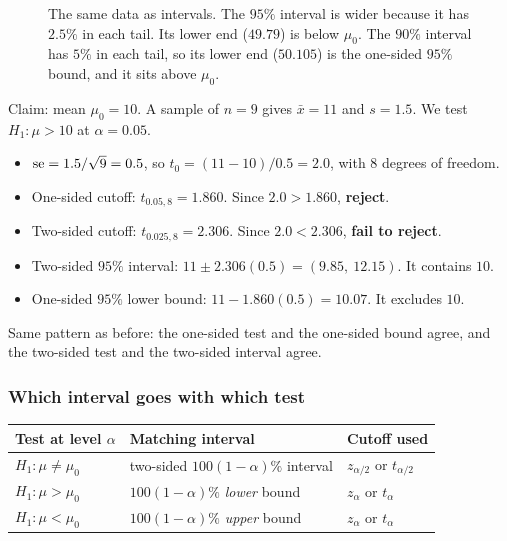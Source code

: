 \begin{figure}[h]
\centering
{}
\caption{The same data as intervals. The $95\%$ interval is wider because it has $2.5\%$ in each tail. Its lower end ($49.79$) is below $\mu_0$. The $90\%$ interval has $5\%$ in each tail, so its lower end ($50.105$) is the one-sided $95\%$ bound, and it sits above $\mu_0$.}
\end{figure}

\begin{example}
Claim: mean $\mu_0=10$. A sample of $n=9$ gives $\bar{x}=11$ and $s=1.5$. We test $H_1:\mu>10$ at $\alpha=0.05$.
\begin{itemize}
  \item $\operatorname{se}=1.5/\sqrt9=0.5$, so $t_0=(11-10)/0.5=2.0$, with $8$ degrees of freedom.
  \item One-sided cutoff: $t_{0.05,8}=1.860$. Since $2.0>1.860$, \textbf{reject}.
  \item Two-sided cutoff: $t_{0.025,8}=2.306$. Since $2.0<2.306$, \textbf{fail to reject}.
  \item Two-sided $95\%$ interval: $11\pm2.306(0.5)=(9.85,\ 12.15)$. It contains $10$.
  \item One-sided $95\%$ lower bound: $11-1.860(0.5)=10.07$. It excludes $10$.
\end{itemize}
Same pattern as before: the one-sided test and the one-sided bound agree, and the two-sided test and the two-sided interval agree.
\end{example}

\subsubsection*{Which interval goes with which test}

\begin{center}
\begin{tabular}{lll}
\toprule
Test at level $\alpha$ & Matching interval & Cutoff used\\
\midrule
$H_1:\mu\ne\mu_0$ & two-sided $100(1-\alpha)\%$ interval & $z_{\alpha/2}$ or $t_{\alpha/2}$\\
$H_1:\mu>\mu_0$ & $100(1-\alpha)\%$ \emph{lower} bound & $z_{\alpha}$ or $t_{\alpha}$\\
$H_1:\mu<\mu_0$ & $100(1-\alpha)\%$ \emph{upper} bound & $z_{\alpha}$ or $t_{\alpha}$\\
\bottomrule
\end{tabular}
\end{center}

